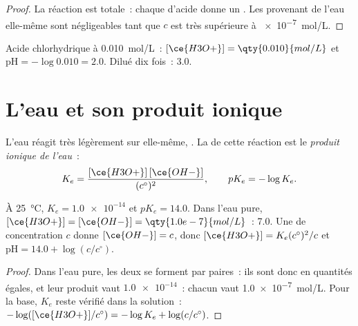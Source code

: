 \begin{proof}
La réaction  est totale~: chaque 
d'acide donne un . Les  provenant de l'eau elle-même sont
négligeables tant que $c$ est très supérieure à \qty{e-7}{mol/L}.
\end{proof}

\begin{example}\label{ex:g12:ka-and-pka:hcl}
Acide chlorhydrique à \qty{0.010}{mol/L}~: $[\ce{H3O+}] = \qty{0.010}{mol/L}$
et $\mathrm{pH} = -\log 0.010 = 2.0$. Dilué dix fois~:  3.0.
\end{example}

\section{L'eau et son produit ionique}


\begin{definition}\label{def:g12:ka-and-pka:ionic-product}
L'eau réagit très légèrement sur elle-même, . La
 de cette réaction est le \emph{produit ionique de
l'eau}~:
\[
  K_e = \frac{[\ce{H3O+}]\,[\ce{OH-}]}{(c^\circ)^2},
  \qquad pK_e = -\log K_e .
\]
\end{definition}

\begin{proposition}\label{prop:g12:ka-and-pka:ke}
À \qty{25}{\celsius}, $K_e = \num{1.0e-14}$ et $pK_e = 14.0$. Dans l'eau
pure,
$[\ce{H3O+}] = [\ce{OH-}] = \qty{1.0e-7}{mol/L}$~:  7.0. Une 
de concentration $c$ donne $[\ce{OH-}] = c$, donc
$[\ce{H3O+}] = K_e (c^\circ)^2 / c$ et $\mathrm{pH} = 14.0 + \log(c/c^\circ)$.
\end{proposition}

\begin{proof}
Dans l'eau pure, les deux  se forment par paires~: ils sont donc en
quantités égales, et leur produit vaut $\num{1.0e-14}$~: chacun vaut
\qty{1.0e-7}{mol/L}. Pour la base, $K_e$ reste vérifié dans la
solution~:
$-\log([\ce{H3O+}]/c^\circ) = -\log K_e + \log(c/c^\circ)$.
\end{proof}

